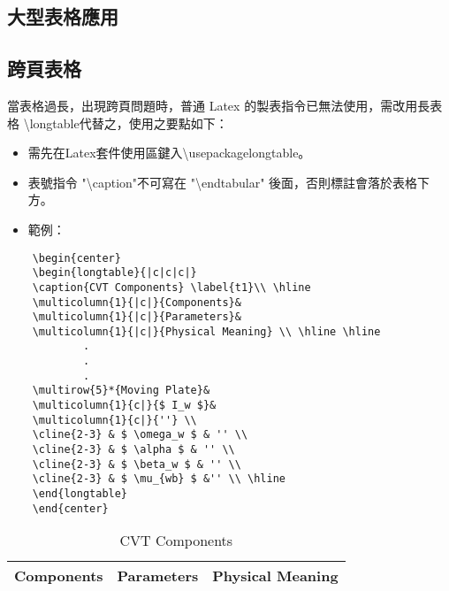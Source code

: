 \documentclass[12pt,a4paper]{report}
\begin{document}
\begin{CJK}{UTF8}{bkai}
\chapter{大型表格應用}
\section{跨頁表格}
當表格過長，出現跨頁問題時，普通 Latex 的製表指令已無法使用，需改用長表格 \textbackslash\textbraceleft longtable\textbraceright 代替之，使用之要點如下：
\begin{itemize}
    \item 需先在Latex套件使用區鍵入\textbackslash usepackage\textbraceleft longtable\textbraceright。
    \item 表號指令 "\textbackslash caption"不可寫在 "\textbackslash end\textbraceleft tabular\textbraceright" 後面，否則標註會落於表格下方。

\vspace{0.5cm}
\item 範例：
\end{itemize}


\vspace{-0.5cm}
\begin{lstlisting}
	\begin{center}
	\begin{longtable}{|c|c|c|} 
	\caption{CVT Components} \label{t1}\\ \hline
	\multicolumn{1}{|c|}{Components}&
	\multicolumn{1}{|c|}{Parameters}&
	\multicolumn{1}{|c|}{Physical Meaning} \\ \hline \hline
			.
			.
			.
	\multirow{5}*{Moving Plate}&
	\multicolumn{1}{c|}{$ I_w $}&
	\multicolumn{1}{c|}{''} \\ 
	\cline{2-3} & $ \omega_w $ & '' \\
	\cline{2-3} & $ \alpha $ & '' \\
	\cline{2-3} & $ \beta_w $ & '' \\
	\cline{2-3} & $ \mu_{wb} $ &'' \\ \hline
	\end{longtable}
	\end{center}
\end{lstlisting}

\vspace{-0.5cm}
\begin{center}
\begin{longtable}{|c|c|c|} 
\caption{CVT Components} \label{t1}\\
\hline
\multicolumn{1}{|c|}{Components}&
\multicolumn{1}{|c|}{Parameters}&
\multicolumn{1}{|c|}{Physical Meaning} \\ \hline \hline


\end{longtable}
\end{center}
\end{CJK}
\end{document}
